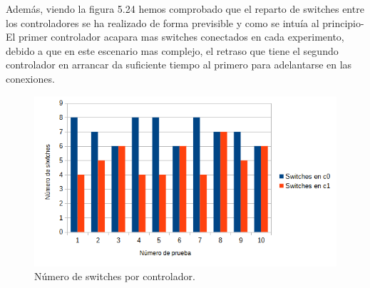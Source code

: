 \documentclass[a4paper, 12pt]{book}
\begin{document}
\begin{figure}[H]
	\centering
	
	\hfill
	\hfill
\end{figure}
	
		Además, viendo la figura 5.24 hemos comprobado que el reparto de switches entre los controladores se ha realizado de forma previsible y como se intuía al principio- El primer controlador acapara mas switches conectados en cada experimento, debido a que en este escenario mas complejo, el retraso que tiene el segundo controlador en arrancar da suficiente tiempo al primero para adelantarse en las conexiones.
		
	\begin{figure}[H]
		\centering
		\includegraphics[width=16cm, keepaspectratio]{img/switchesporcontrollerescenario3}
		\caption{Número de switches por controlador.}
		\label{figura:switchesporcontrollerescenario4}
	\end{figure}
	
\end{document}
